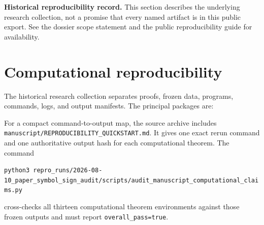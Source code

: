 \noindent\textbf{Historical reproducibility record.} This section describes the underlying research collection, not a promise that every named artifact is in this public export. See the dossier scope statement and the public reproducibility guide for availability.
\medskip

\section{Computational reproducibility}\label{sec:reproducibility}

The historical research collection separates proofs, frozen data,
programs, commands, logs, and output manifests.  The principal packages are:

For a compact command-to-output map, the source archive includes
\nolinkurl{manuscript/REPRODUCIBILITY_QUICKSTART.md}.  It gives one exact
rerun command and one authoritative output hash for each computational
theorem.  The command
\begin{center}
\small\texttt{python3 }\nolinkurl{repro_runs/2026-08-10_paper_symbol_sign_audit/scripts/audit_manuscript_computational_claims.py}
\end{center}
cross-checks all thirteen computational theorem environments against those
frozen outputs and must report \nolinkurl{overall_pass=true}.

